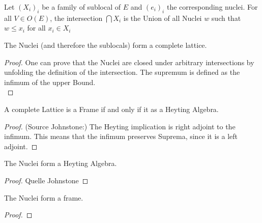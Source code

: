 \begin{definition}
    \label{def:sublocal_intersection}
    \leanok
    Let $(X_i)_i$ be a family of sublocal of $E$ and $(e_i)_i$ the corresponding nuclei.
    For all $V \in O(E)$, the intersection $\bigcap X_i$ is the Union of all Nuclei $w$ such that $w \le x_i $ for all $x_i \in X_i $
\end{definition}

\begin{lemma}
    \label{lem:nucleus_complete_lattice}
    \leanok
    The Nuclei (and therefore the sublocals) form a complete lattice.
\end{lemma}
\begin{proof}
    One can prove that the Nuclei are closed under arbitrary intersections by unfolding the definition of the intersection. The supremum is defined as the infimum of the upper Bound. \\
    \leanok
\end{proof}

\begin{proposition}
    \label{prop:complete_heyting_algebra}
    \mathlibok
    \leanok
    A complete Lattice is a Frame if and only if it as a Heyting Algebra.
\end{proposition}
\begin{proof}
(Source Johnstone:) The Heyting implication is right adjoint to the infimum. This means that the infimum preserves
Suprema, since it is a left adjoint.
    \leanok
\end{proof}


\begin{lemma}
    \label{lem:nucleus_heyting_algebra}
    \leanok
    The Nuclei form a Heyting Algebra.
\end{lemma}
\begin{proof}
    \leanok
    Quelle Johnstone
\end{proof}


\begin{lemma}
    \label{lem:nucleus_frame}
    \leanok
    The Nuclei  form a frame.
\end{lemma}
\begin{proof}
    \leanok
\end{proof}

